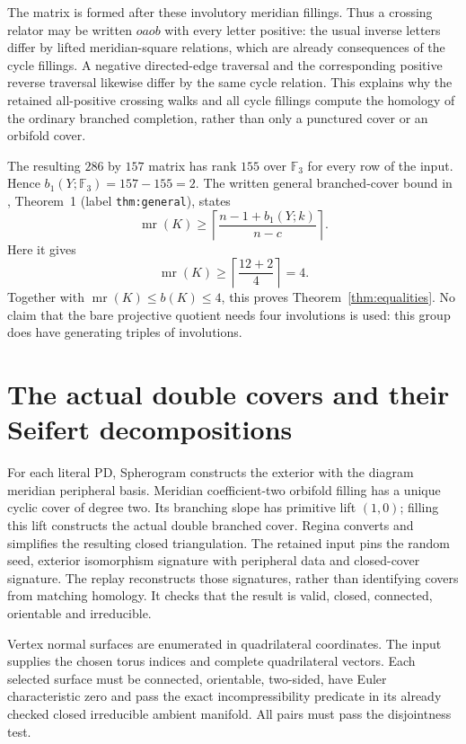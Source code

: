\documentclass[11pt]{article}
\newcommand{\mr}{\operatorname{mr}}
\newcommand{\F}{\mathbb F}
\begin{document}
The matrix is formed after these involutory meridian fillings.
Thus a crossing relator may be written $oao b$ with every letter
positive: the usual inverse letters differ by lifted meridian-square
relations, which are already consequences of the cycle fillings.
A negative directed-edge traversal and the corresponding positive
reverse traversal likewise differ by the same cycle relation.
This explains why the retained all-positive crossing walks and
all cycle fillings compute the homology of the ordinary branched
completion, rather than only a punctured cover or an orbifold cover.

The resulting $286$ by $157$ matrix has rank $155$ over $\F_3$ for
every row of the input. Hence $b_1(Y;\F_3)=157-155=2$.
The written general branched-cover bound in
,
Theorem~1 (label \texttt{thm:general}), states
\[
 \mr(K)\ge
 \left\lceil\frac{n-1+b_1(Y;k)}{n-c}\right\rceil.
\]
Here it gives
\[
             \mr(K)\ge\left\lceil\frac{12+2}{4}\right\rceil=4.
\]
Together with $\mr(K)\le b(K)\le4$, this proves
Theorem~\ref{thm:equalities}.
No claim that the bare projective quotient needs four involutions is
used: this group does have generating triples of involutions.

\section{The actual double covers and their Seifert decompositions}

For each literal PD, Spherogram constructs the exterior with the diagram
meridian peripheral basis. Meridian coefficient-two orbifold filling
has a unique cyclic cover of degree two. Its branching slope has
primitive lift $(1,0)$; filling this lift constructs the actual
double branched cover. Regina converts and simplifies the resulting
closed triangulation. The retained input pins the random seed, exterior
isomorphism signature with peripheral data and closed-cover signature.
The replay reconstructs those signatures, rather than identifying
covers from matching homology. It checks that the result is valid,
closed, connected, orientable and irreducible.

Vertex normal surfaces are enumerated in quadrilateral coordinates.
The input supplies the chosen torus indices and complete quadrilateral
vectors. Each selected surface must be connected, orientable,
two-sided, have Euler characteristic zero and pass the exact
incompressibility predicate in its already checked closed irreducible
ambient manifold. All pairs must pass the disjointness test.
\end{document}
